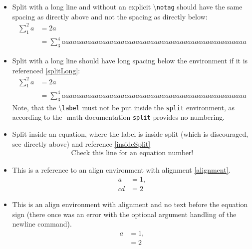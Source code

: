 \documentclass{article}
\begin{document}
\begin{itemize}
\begin{equation}
			\end{equation}
		\item Split with a long line and without an explicit \textbackslash\texttt{notag} should have the same spacing as directly above and not the spacing as directly below:
			\begin{equation}
				\begin{split}
					\sum_1^2 a &= 2a\\
							&= \sum_3^4 aaaaaaaaaaaaaaaaaaaaaaaaaaaaaaaaaaaaaaaaaaaaaaaaaa
				\end{split}
			\end{equation}
		\item Split with a long line should have long spacing below the environment if it is referenced \ref{splitLong}:
			\begin{equation}\label{splitLong}
				\begin{split}
					\sum_1^2 a &= 2a\\
							&= \sum_3^4 aaaaaaaaaaaaaaaaaaaaaaaaaaaaaaaaaaaaaaaaaaaaaaaaaa
				\end{split}
			\end{equation}
			Note, that the \textbackslash\texttt{label} must not be put inside the \texttt{split} environment, as according to the \AmS-math documentation \texttt{split} provides no numbering.
		\item Split inside an equation, where the label is inside split (which is discouraged, see directly above) and reference \ref{insideSplit}
			\begin{equation}
				\begin{split}
					\label{insideSplit}
					\text{Check this line for an equation number!}
				\end{split}
			\end{equation}
		\item This is a reference to an align environment with alignment \ref{alignment}.
			\begin{align}%
				a &= 1,\label{alignment}\\%
				cd &= 2\label{rowTwo}%
			\end{align}%
		\item This is an align environment with alignment and no text before the equation sign (there once was an error with the optional argument handling of the newline command).
			\begin{align}
				a &= 1,\label{eq:a}\\
				&= 2\label{eq:b}
			\end{align}
	\end{itemize}
\end{document}
